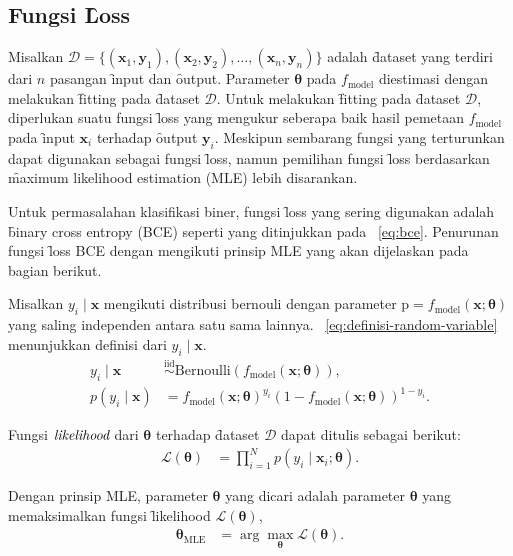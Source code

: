     \subsection{Fungsi \f{Loss}}
    Misalkan $\mathcal{D} = \{(\mathbf{x}_1, \mathbf{y}_1), (\mathbf{x}_2, \mathbf{y}_2), \dots, (\mathbf{x}_n, \mathbf{y}_n)\}$ adalah \f{dataset} yang terdiri dari $n$ pasangan \f{input} dan \f{output}. Parameter $\bm{\theta}$ pada $f_{\text{model}}$ diestimasi dengan melakukan \f{fitting} pada \f{dataset} $\mathcal{D}$. Untuk melakukan \f{fitting} pada \f{dataset} $\mathcal{D}$, diperlukan suatu fungsi \f{loss} yang mengukur seberapa baik hasil pemetaan $f_{\text{model}}$ pada \f{input} $\mathbf{x}_i$ terhadap \f{output} $\mathbf{y}_i$. Meskipun sembarang fungsi yang terturunkan dapat digunakan sebagai fungsi \f{loss}, namun pemilihan fungsi \f{loss} berdasarkan \f{maximum likelihood estimation} (MLE) lebih disarankan. 
    
    Untuk permasalahan klasifikasi biner, fungsi \f{loss} yang sering digunakan adalah \f{binary cross entropy} (BCE) seperti yang ditinjukkan pada \equ~\ref{eq:bce}. Penurunan fungsi \f{loss} BCE dengan mengikuti prinsip MLE yang akan dijelaskan pada bagian berikut.
    
    Misalkan $y_i \mid \mathbf{x}$ mengikuti distribusi bernouli dengan parameter $\text{p} = f_{\text{model}}(\mathbf{x};\bm{\theta})$ yang saling independen antara satu sama lainnya. \equ~\ref{eq:definisi-random-variable} menunjukkan definisi dari $y_i \mid \mathbf{x}$.
    \begin{align}
        \label{eq:definisi-random-variable}
        y_i \mid \mathbf{x} &\overset{\text{iid}}{\sim} \text{Bernoulli}(f_{\text{model}}(\mathbf{x};\bm{\theta})), \\
        p(y_i \mid \mathbf{x}) &= f_{\text{model}}(\mathbf{x};\bm{\theta})^{y_i} (1 - f_{\text{model}}(\mathbf{x};\bm{\theta}))^{1 - y_i}.
    \end{align} 

    Fungsi $\textit{likelihood}$ dari $\bm{\theta}$ terhadap \f{dataset} $\mathcal{D}$ dapat ditulis sebagai berikut:
    \begin{align}
        \mathcal{L}(\bm{\theta}) &= \prod_{i=1}^N p(y_i \mid \mathbf{x}_i; \bm{\theta}).
    \end{align}

    Dengan prinsip MLE, parameter $\bm{\theta}$ yang dicari adalah parameter $\bm{\theta}$ yang memaksimalkan fungsi \f{likelihood} $\mathcal{L}(\bm{\theta})$,
    \begin{align}
        \bm{\theta}_{\text{MLE}} &= \arg\max_{\bm{\theta}} \mathcal{L}(\bm{\theta}).
    \end{align}

